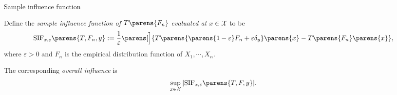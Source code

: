 \documentclass[aspectratio=169,xcolor=dvipsnames]{beamer}
\begin{document}
\begin{frame}{Sample influence function}
	
%	
	
	Define the \textit{sample influence function of $T \parens{F_n}$ 
	evaluated at $x \in \mathcal{X}$} to be 
	\begin{align}
		\mathrm{SIF}_{x, \varepsilon} \parens{T, F_n, y} := \frac{1}{\varepsilon} \parens[\Big]{T \parens{\parens{1 - \varepsilon} F_n + \varepsilon \delta_y} \parens{x} - T \parens{F_n} \parens{x}}, %
	\end{align}
	where $\varepsilon > 0$ and $F_n$ is the empirical distribution function of $X_1, \cdots, X_n$. 
	
	\vspace{10pt}
	
	The corresponding \textit{overall influence} is %
	\begin{align*}
		\sup_{x \in \mathcal{X}} \vert \mathrm{SIF}_{x, \varepsilon} \parens{T, F, y} \vert. %
	\end{align*}
	
\end{frame}
\end{document}

